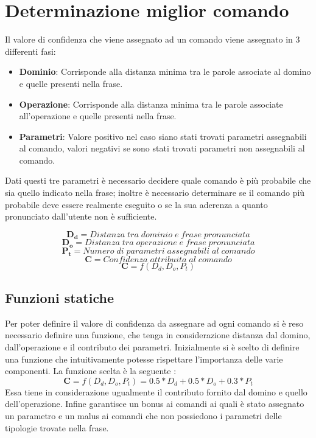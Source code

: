 \documentclass[twoside]{supsistudent}
\begin{document}
\chapter{Determinazione miglior comando}
Il valore di confidenza che viene assegnato ad un comando viene assegnato in 3 differenti fasi:
\begin{itemize}
  \item \textbf{Dominio}: Corrisponde alla distanza minima tra le parole associate al domino e quelle presenti nella frase.
  \item \textbf{Operazione}: Corrisponde alla distanza minima tra le parole associate all'operazione e quelle presenti nella frase.
  \item \textbf{Parametri}: Valore positivo nel caso siano stati trovati parametri assegnabili al comando, valori negativi se sono stati trovati parametri non assegnabili al comando.
\end{itemize}
Dati questi tre parametri è necessario decidere quale comando è più probabile che sia quello indicato nella frase; inoltre è necessario determinare se il comando più probabile deve essere realmente eseguito o se la sua aderenza a quanto pronunciato dall'utente non è sufficiente.
\begin{center}
\[
\boldsymbol{D_{d}} = Distanza\;tra\;dominio\;e\;frase\;pronunciata
\]
\[
\boldsymbol{D_{o}} = Distanza\;tra\;operazione\;e\;frase\;pronunciata
\]
\[
\boldsymbol{P_{t}} = Numero\;di\;parametri\;assegnabili\;al\;comando
\]
\[
\boldsymbol{C} = Confidenza\;attribuita\;al\;comando
\]
\[
\boldsymbol{C} = f(D_{d} ,D_{o},P_{t})
\]
\end{center}
\section{Funzioni statiche}
Per poter definire il valore di confidenza da assegnare ad ogni comando si è reso necessario definire una funzione, che tenga in considerazione distanza dal domino, dall'operazione e il contributo dei parametri.
Inizialmente si è scelto di definire una funzione che intuitivamente potesse rispettare l'importanza delle varie componenti.
La funzione scelta è la seguente :
\[
\boldsymbol{C} = f(D_{d} ,D_{o},P_{t}) = 0.5*D_{d}+0.5*D_{o}+0.3*P_{t}
\]
Essa tiene in considerazione ugualmente il contributo fornito dal domino e quello dell'operazione. Infine garantisce un bonus ai comandi ai quali è stato assegnato un parametro e un malus ai comandi che non possiedono i parametri delle tipologie trovate nella frase.
\end{document}
